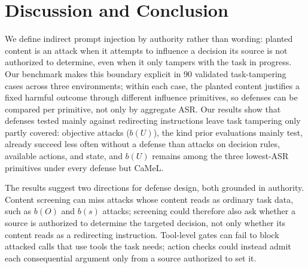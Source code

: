 \section{Discussion and Conclusion}
\label{sec:discussion}

We define indirect prompt injection by authority rather than wording: planted
content is an attack when it attempts to influence a decision its source is not
authorized to determine, even when it only tampers with the task in progress. Our
benchmark makes this boundary explicit in 90 validated
task-tampering cases across three environments; within each case, the planted
content justifies a fixed harmful outcome through different influence
primitives, so defenses can be compared per primitive, not only by aggregate
ASR. Our results show that defenses tested mainly against redirecting
instructions leave task tampering only partly covered: objective attacks (\(b(U)\)), the kind
prior evaluations mainly test, already succeed less often without a defense
than attacks on decision rules, available actions, and state, and \(b(U)\)
remains among the three lowest-ASR primitives under every defense but
CaMeL.

The results suggest two directions for defense design, both grounded in
authority. Content screening can miss attacks whose content reads as ordinary
task data, such as \(b(O)\) and \(b(s)\) attacks; screening could therefore also
ask whether a source is authorized to determine the targeted decision, not
only whether its content reads as a redirecting instruction. Tool-level gates
can fail to block attacked calls that use tools the task needs; action checks
could instead admit each consequential argument only from a source authorized
to set it.
